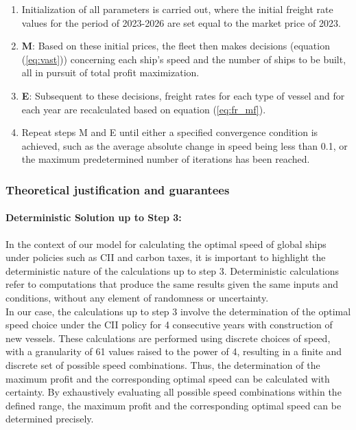 \documentclass[a4paper,12pt]{article}
\begin{document}
\begin{enumerate}
	\item Initialization of all parameters is carried out, where the initial freight rate values for the period of 2023-2026 are set equal to the market price of 2023.
	\item \textbf{M}: Based on these initial prices, the fleet then makes decisions (equation (\ref{eq:vast})) concerning each ship's speed and the number of ships to be built, all in pursuit of total profit maximization.
	\item \textbf{E}: Subsequent to these decisions, freight rates for each type of vessel and for each year are recalculated based on equation (\ref{eq:fr_mf}).
	\item Repeat steps M and E until either a specified convergence condition is achieved, such as the average absolute change in speed being less than 0.1, or the maximum predetermined number of iterations has been reached.\\
\end{enumerate}


\subsubsection{Theoretical justification and guarantees}

\paragraph{Deterministic Solution up to Step 3:}

In the context of our model for calculating the optimal speed of global ships under policies such as CII and carbon taxes, it is important to highlight the deterministic nature of the calculations up to step 3.
Deterministic calculations refer to computations that produce the same results given the same inputs and conditions, without any element of randomness or uncertainty.\\

In our case, the calculations up to step 3 involve the determination of the optimal speed choice under the CII policy for 4 consecutive years with construction of new vessels.
These calculations are performed using discrete choices of speed, with a granularity of 61 values raised to the power of 4, resulting in a finite and discrete set of possible speed combinations.
Thus, the determination of the maximum profit and the corresponding optimal speed can be calculated with certainty.
By exhaustively evaluating all possible speed combinations within the defined range, the maximum profit and the corresponding optimal speed can be determined precisely.\\
\end{document}
